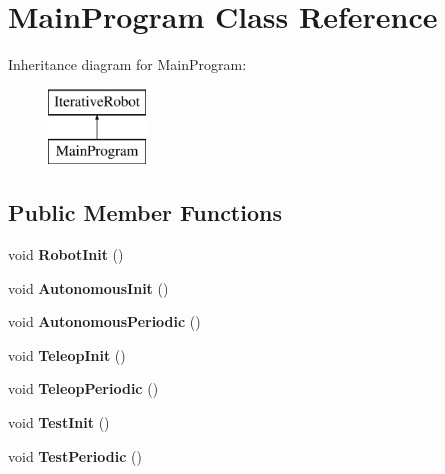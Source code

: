 \hypertarget{class_main_program}{}\section{Main\+Program Class Reference}
\label{class_main_program}
Inheritance diagram for Main\+Program\+:\begin{figure}[H]
\begin{center}
\leavevmode
\includegraphics[height=2.000000cm]{class_main_program}
\end{center}
\end{figure}
\subsection*{Public Member Functions}
\begin{DoxyCompactItemize}
\item 
\mbox{\label{class_main_program_a7e874801d13eddebc3d6abb0bddcd741}} 
void {\bfseries Robot\+Init} ()
\item 
\mbox{\label{class_main_program_a0e4b90779d59d7d37534514a7f53e70d}} 
void {\bfseries Autonomous\+Init} ()
\item 
\mbox{\label{class_main_program_a203b4b5345da0064b1131be9e769ce44}} 
void {\bfseries Autonomous\+Periodic} ()
\item 
\mbox{\label{class_main_program_a7c27fa2f63d0289ec779ca2d8cf17db7}} 
void {\bfseries Teleop\+Init} ()
\item 
\mbox{\label{class_main_program_a9ad6dd3b0af4928522a2f51f93a502ab}} 
void {\bfseries Teleop\+Periodic} ()
\item 
\mbox{\label{class_main_program_a6cc3d4d9df4c41a2c0d69338d7a232a8}} 
void {\bfseries Test\+Init} ()
\item 
\mbox{\label{class_main_program_ae39fe132e153d724c9b0991e5c8b72ea}} 
void {\bfseries Test\+Periodic} ()
\end{DoxyCompactItemize}
